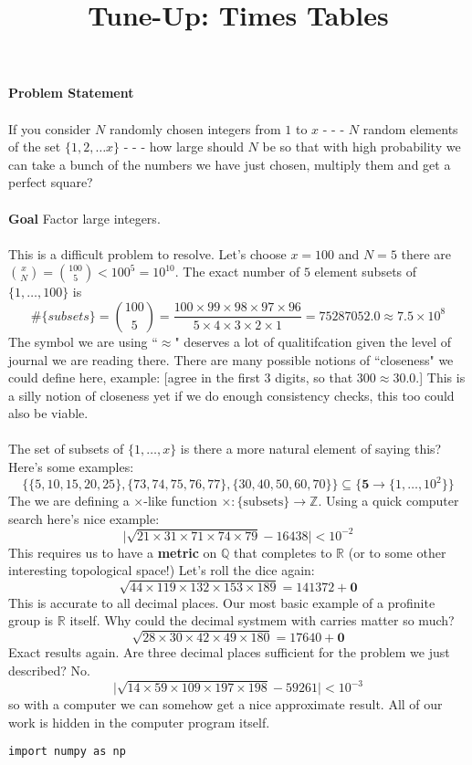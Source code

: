 \documentclass[12pt]{article}
\title{Tune-Up: Times Tables}
\date{}
\begin{document}
\sffamily

\maketitle

{\fontsize{16pt}{16pt}\selectfont 

\noindent  \textbf{Problem Statement} \\ \\
If you consider $N$ randomly chosen integers from $1$ to $x$  - - - $N$ random elements of the set $\{ 1, 2, \dots x\}$ - - - how large should $N$ be so that with high probability we can take a bunch of the numbers we have just chosen, multiply them and get a perfect square? \\ \\
\textbf{Goal} Factor large integers. \\ \\
\noindent This is a difficult problem to resolve.  Let's choose $x = 100$ and $N = 5$ there are $\binom{x}{N} = \binom{100}{5}  < 100^5 = 10^{10} $.  The exact number of $5$ element subsets of $\{ 1, \dots, 100\}$ is 
$$ \# \{ subsets\} = \binom{100}{5} = \frac{100 \times 99 \times 98 \times 97 \times 96}{5 \times 4 \times 3 \times 2 \times 1} = 75287052.0 \approx   7.5 \times 10^8 $$
The symbol we are using ``$\approx$" deserves a lot of qualitifcation given the level of journal we are reading there.  There are many possible notions of ``closeness" we could define here, example: [agree in the first 3 digits, so that $300 \approx 30.0$.]  This is a silly notion of closeness yet if we do enough consistency checks, this too could also be viable. \\ \\
The set of subsets of $\{ 1, \dots, x\}$ is there a more natural element of saying this?  Here's some examples:
$$ \Big\{ \{ 5, 10, 15, 20, 25\}, \{ 73, 74, 75, 76, 77 \}, \{ 30, 40, 50, 60, 70 \} \Big\}  \subseteq \Big\{ \mathbf{5} \to \{ 1, \dots , 10^2 \} \Big\} $$
The we are defining a $\times$-like function $\times: \{ \text{subsets} \} \to \mathbb{Z}$.  Using a quick computer search here's nice example:
$$ \big| \sqrt{21 \times 31 \times 71 \times 74 \times 79 } - 16438 \big| < 10^{-2}$$
This requires us to have a \textbf{metric} on $\mathbb{Q}$ that completes to $\mathbb{R}$ (or to some other interesting topological space!) Let's roll the dice again:
$$ \sqrt{44 \times 119 \times 132 \times 153 \times 189} = 141372 + \mathbf{0} $$
This is accurate to all decimal places.  Our most basic example of a profinite group is $\mathbb{R}$ itself.  Why could the decimal systmem with carries matter so much?
$$ \sqrt{28 \times 30 \times 42 \times 49 \times 180} = 17640 + \mathbf{0} $$
Exact results again.  Are three decimal places sufficient for the problem we just described?  No.
$$ \Big| \sqrt{14 \times 59 \times 109 \times 197 \times 198} - 59261 \Big| < 10^{-3} $$
so with a computer we can somehow get a nice approximate result.  All of our work is hidden in the computer program itself. 
\begin{verbatim}
import numpy as np


\end{verbatim}}
\end{document}
